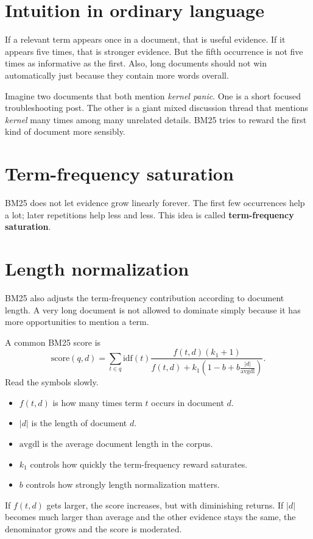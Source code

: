 \documentclass[11pt,oneside]{report}
\newcommand{\term}[1]{\textbf{#1}}
\begin{document}
\section*{Intuition in ordinary language}
If a relevant term appears once in a document, that is useful evidence. If it appears five times, that is stronger evidence. But the fifth occurrence is not five times as informative as the first. Also, long documents should not win automatically just because they contain more words overall.

\begin{intuitionbox}
Imagine two documents that both mention \emph{kernel panic}. One is a short focused troubleshooting post. The other is a giant mixed discussion thread that mentions \emph{kernel} many times among many unrelated details. BM25 tries to reward the first kind of document more sensibly.
\end{intuitionbox}

\section*{Term-frequency saturation}
BM25 does not let evidence grow linearly forever. The first few occurrences help a lot; later repetitions help less and less. This idea is called \term{term-frequency saturation}.

\section*{Length normalization}
BM25 also adjusts the term-frequency contribution according to document length. A very long document is not allowed to dominate simply because it has more opportunities to mention a term.

\begin{formulabox}
A common BM25 score is
\[
\mathrm{score}(q,d)=\sum_{t\in q}\mathrm{idf}(t)
\frac{f(t,d)(k_1+1)}{f(t,d)+k_1\left(1-b+b\frac{|d|}{\mathrm{avgdl}}\right)}.
\]
Read the symbols slowly.
\begin{itemize}
\item $f(t,d)$ is how many times term $t$ occurs in document $d$.
\item $|d|$ is the length of document $d$.
\item $\mathrm{avgdl}$ is the average document length in the corpus.
\item $k_1$ controls how quickly the term-frequency reward saturates.
\item $b$ controls how strongly length normalization matters.
\end{itemize}
If $f(t,d)$ gets larger, the score increases, but with diminishing returns. If $|d|$ becomes much larger than average and the other evidence stays the same, the denominator grows and the score is moderated.
\end{formulabox}
\end{document}
